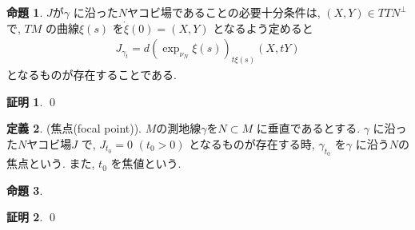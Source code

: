 \documentclass[twocolumn, landscape, a4paper , 8pt, fleqn, titlepage ]{jsarticle}
\theoremstyle{definition}
\newtheorem{dfn}{定義}[section]
\newtheorem{prop}[dfn]{命題}
\newtheorem*{pf*}{証明}
\renewcommand{\-}{\hyphen}
\begin{document}
\begin{prop}
$J$が$\gamma$ に沿った$N$ヤコビ場であることの必要十分条件は, $(X,Y) \in TTN^\perp$ で, $TM$ の曲線$\xi (s)$ を$\dot \xi (0) = (X,Y)$ となるよう定めると
\begin{align*} J_{\gamma_t} = d (\exp_{\nu_N} \xi (s)) _{t \xi (s)} (X, tY)\end{align*}
となるものが存在することである. 
\end{prop}
\begin{pf*}

\qed
\end{pf*}

\begin{dfn}(焦点(focal point)). $M$の測地線$\gamma$を$N \subset M$ に垂直であるとする. $\gamma$ に沿った$N$ヤコビ場$J$ で, $J_{t_0} = 0 \,\, (t_0 > 0)$ となるものが存在する時, $\gamma_{t_0}$ を$\gamma$ に沿う$N$の焦点という. また, $t_0$ を焦値という. 
\end{dfn}

\begin{prop}

\end{prop}
\begin{pf*}

\qed
\end{pf*}
\end{document}
